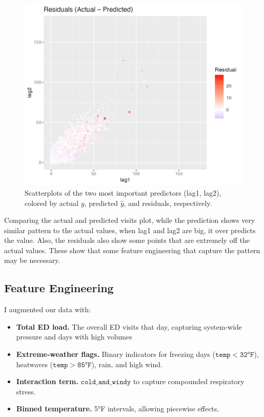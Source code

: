 \documentclass[11pt]{article}
\begin{document}
\begin{figure}[H]
\begin{minipage}[b]{0.32\textwidth}
  \end{minipage}\hfill
  \begin{minipage}[b]{0.32\textwidth}
    \centering
    \includegraphics[width=\textwidth]{plot_residuals_vs_top2.png}
  \end{minipage}
  \caption{Scatterplots of the two most important predictors (lag1, lag2), colored by actual \(y\), predicted \(\hat y\), and residuals, respectively.}
  \label{fig:explore_top2}
\end{figure}

Comparing the actual and predicted visits plot, while the prediction shows very similar pattern to the actual values, when lag1 and lag2 are big, it over predicts the value. Also, the residuals also show some points that are extremely off the actual values. These show that some feature engineering that capture the pattern may be necessary.


\subsection{Feature Engineering}

I augmented our data with:

\begin{itemize}[nosep]
  \item \textbf{Total ED load.}  The overall ED visits that day, capturing system‐wide pressure and days with high volumes  
  \item \textbf{Extreme‐weather flags.}  Binary indicators for freezing days (\(\mathtt{temp<32°F}\)), heatwaves (\(\mathtt{temp>85°F}\)), rain, and high wind.  
  \item \textbf{Interaction term.}  \(\mathtt{cold\_and\_windy}\) to capture compounded respiratory stress.  
  \item \textbf{Binned temperature.}  5°F intervals, allowing piecewise effects.  
\end{itemize}
\end{document}
